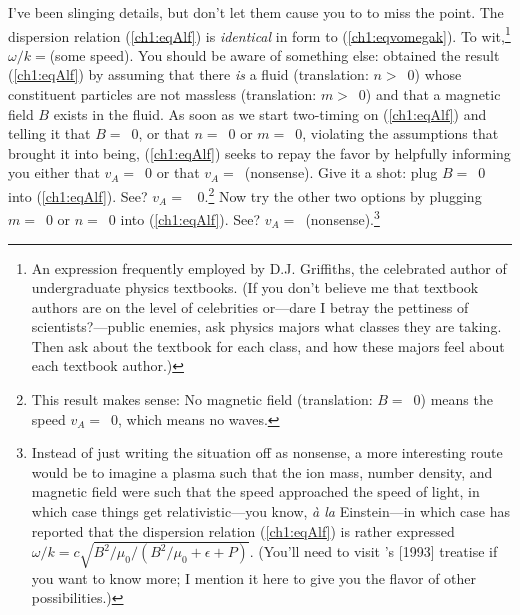 I've been slinging details, but don't let them cause you to to miss the
point. The dispersion relation (\ref{ch1:eqAlf}) is \emph{identical} in form to
(\ref{ch1:eqvomegak}). To wit,\footnote{An expression frequently employed by
  D.J. Griffiths, the celebrated author of undergraduate physics textbooks. (If
  you don't believe me that textbook authors are on the level of celebrities
  or---dare I betray the pettiness of scientists?---public enemies, ask physics
  majors what classes they are taking. Then ask about the textbook for each
  class, and how these majors feel about each textbook author.)}
$ \omega / k = $(some speed). You should be aware of something else: \Alf
obtained the result (\ref{ch1:eqAlf}) by assuming that there \emph{is} a fluid
(translation: $n >$~0) whose constituent particles are not massless
(translation: $m >$~0) and that a magnetic field $B$ exists in the fluid. As
soon as we start two-timing on (\ref{ch1:eqAlf}) and telling it that
$B =$~0, or that $n =$~0 or $m =$~0, violating the assumptions that brought it
into being, (\ref{ch1:eqAlf}) seeks to repay the favor by helpfully
informing you either that $v_A =$~0 or that $v_A =$~(nonsense). Give it a shot:
plug $B =$~0 into (\ref{ch1:eqAlf}). See? $v_A =$~ 0.\footnote{This result makes
  sense: No magnetic field (translation: $B =$~0) means the \Alf speed
  $v_A =$~0, which means no \Alf waves.}  Now try the other two options by
plugging $m =$~0 or $n =$~0 into (\ref{ch1:eqAlf}). See?
$v_A =$~(nonsense).\footnote{Instead of just writing the situation off as
  nonsense, a more interesting route would be to imagine a plasma such that the
  ion mass, number density, and magnetic field were such that the \Alf speed
  approached the speed of light, in which case things get relativistic---you
  know, \textit{\`{a} la} Einstein---in which case \citet{Gedalin1993} has
  reported that the dispersion relation (\ref{ch1:eqAlf}) is rather expressed
  $\omega / k = c \sqrt{B^2/\mu_0 / (B^2/\mu_0 + \epsilon + P)}$. (You'll need
  to visit \citeauthor{Gedalin1993}'s [1993] treatise if you want to know more;
  I mention it here to give you the flavor of other
  possibilities.)}%

